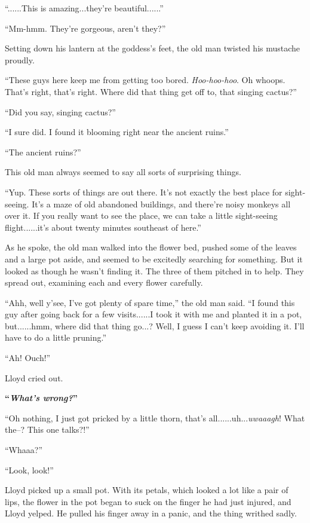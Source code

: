 \documentclass[
]{article}
\begin{document}
``......This is amazing...they're beautiful......''

``Mm-hmm. They're gorgeous, aren't they?''

Setting down his lantern at the goddess's feet, the old man twisted his
mustache proudly.

``These guys here keep me from getting too bored. \emph{Hoo-hoo-hoo}. Oh
whoops. That's right, that's right. Where did that thing get off to,
that singing cactus?''

``Did you say, singing cactus?''

``I sure did. I found it blooming right near the ancient ruins.''

``The ancient ruins?''

This old man always seemed to say all sorts of surprising things.

``Yup. These sorts of things are out there. It's not exactly the best
place for sight-seeing. It's a maze of old abandoned buildings, and
there're noisy monkeys all over it. If you really want to see the place,
we can take a little sight-seeing flight......it's about twenty minutes
southeast of here.''

As he spoke, the old man walked into the flower bed, pushed some of the
leaves and a large pot aside, and seemed to be excitedly searching for
something. But it looked as though he wasn't finding it. The three of
them pitched in to help. They spread out, examining each and every
flower carefully.

``Ahh, well y'see, I've got plenty of spare time,'' the old man said.
``I found this guy after going back for a few visits......I took it with
me and planted it in a pot, but......hmm, where did that thing go...?
Well, I guess I can't keep avoiding it. I'll have to do a little
pruning.''

``Ah! Ouch!''

Lloyd cried out.

\textbf{``}\emph{\textbf{What's wrong?}}\textbf{''}

``Oh nothing, I just got pricked by a little thorn, that's
all......uh...\emph{uwaaagh}! What the--? This one talks?!''

``Whaaa?''

``Look, look!''

Lloyd picked up a small pot. With its petals, which looked a lot like a
pair of lips, the flower in the pot began to suck on the finger he had
just injured, and Lloyd yelped. He pulled his finger away in a panic,
and the thing writhed sadly.
\end{document}
